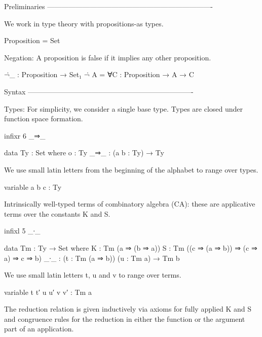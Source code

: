 
Preliminaries
----------------------------------------------------------------------

We work in type theory with propositions-as types.

\begin{code}
Proposition = Set
\end{code}

Negation: A proposition is false if it implies any other proposition.

\begin{code}
¬̇_ : Proposition → Set₁
¬̇ A = ∀{C : Proposition} → A → C
\end{code}

Syntax
----------------------------------------------------------------------

Types:
For simplicity, we consider a single base type.
Types are closed under function space formation.

\begin{code}
infixr 6 _⇒_

data Ty : Set where
  o    : Ty
  _⇒_  : (a b : Ty) → Ty
\end{code}

We use small latin letters from the beginning of the alphabet to range over types.

\begin{code}
variable a b c : Ty
\end{code}

Intrinsically well-typed terms of combinatory algebra (CA):
these are applicative terms over the constants K and S.

\begin{code}
infixl 5 _∙_

data Tm : Ty → Set where
  K    : Tm (a ⇒ (b ⇒ a))
  S    : Tm ((c ⇒ (a ⇒ b)) ⇒ (c ⇒ a) ⇒ c ⇒ b)
  _∙_  : (t : Tm (a ⇒ b)) (u : Tm a) → Tm b
\end{code}

We use small latin letters t, u and v to range over terms.

\begin{code}
variable t t′ u u′ v v′ : Tm a
\end{code}

The reduction relation is given inductively
via axioms for fully applied K and S
and congruence rules for the reduction
in either the function or the argument part
of an application.

